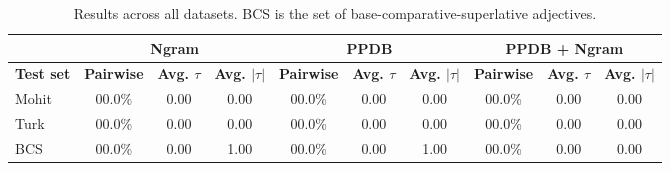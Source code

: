 

\begin{table}
\small
\centering
\begin{tabular}{|l|ccc|ccc|ccc|}
	\hline 
	& \multicolumn{3}{c|}{Ngram} 
	& \multicolumn{3}{c|}{PPDB} 
	& \multicolumn{3}{c|}{PPDB + Ngram} \\
	\hline 
	\bf Test set
	& \bf Pairwise & \bf Avg. $\tau$ & \bf Avg. $|\tau|$ 
	& \bf Pairwise & \bf Avg. $\tau$ & \bf Avg. $|\tau|$ 
	& \bf Pairwise & \bf Avg. $\tau$ & \bf Avg. $|\tau|$ \\ 
	\hline
	Mohit & 00.0\%  & 0.00 & 0.00 & 00.0\% & 0.00 & 0.00 & 00.0\% & 0.00 & 0.00 \\ 
	Turk  & 00.0\%  & 0.00 & 0.00 & 00.0\% & 0.00 & 0.00 & 00.0\% & 0.00 & 0.00 \\
	BCS   & 00.0\%  & 0.00 & 1.00 & 00.0\% & 0.00 & 1.00 & 00.0\% & 0.00 & 0.00 \\
	\hline
\end{tabular}
\caption{\label{font-table} Results across all datasets. BCS is the set of base-comparative-superlative adjectives. }
\end{table}

